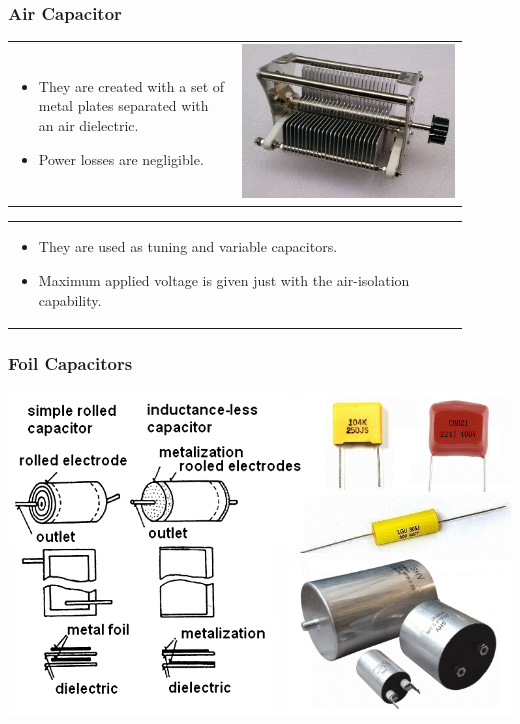 \documentclass{beamer}
\begin{document}
	\begin{frame}
    \frametitle{Air Capacitor}
		\small
		\begin{tabular}{m{0.45\linewidth} m{0.45\linewidth}}
		\begin{itemize}
			\item They are created with a set of metal plates separated with an air dielectric.
			\item Power losses are negligible.
		\end{itemize}
		& \includegraphics[scale=0.3]{obr04_vzduchovyKond.png}
		\end{tabular}
		\begin{tabular}{m{0.9\linewidth}}
		\begin{itemize}
			\item They are used as tuning and variable capacitors.
			\item Maximum applied voltage is given just with the air-isolation capability.
		\end{itemize}
		\end{tabular}
  \end{frame}
	\begin{frame}
    \frametitle{Foil Capacitors}
		\begin{center}
			\includegraphics[scale=0.5]{obr05_foliovyKond.png}
		\end{center}
  \end{frame}
\end{document}
